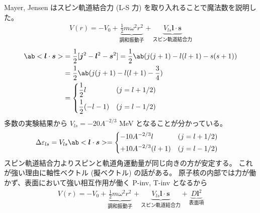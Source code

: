 \documentclass[uplatex,dvipdfmx,a4paper,11pt]{jlreq}
\numberwithin{equation}{section}
\theoremstyle{definition}
\begin{document}
Mayer, Jensen はスピン軌道結合力 (L-S 力) を取り入れることで魔法数を説明した。
\begin{align}
  V(r) = -V_0 + \underbrace{\frac{1}{2}m\omega^2r^2}_{調和振動⼦} + \underbrace{V_{ls}\bm{l}\cdot\bm{s}}_{スピン軌道結合力}
\end{align}
\begin{align}
  \ab<\bm{l}\cdot\bm{s}> & = \frac{1}{2}[\bm{j}^2 - \bm{l}^2 - \bm{s}^2] = \frac{1}{2}\ab(j(j + 1) - l(l + 1) - s(s + 1)) \\
                         & = \frac{1}{2}\ab(j(j + 1) - l(l + 1) - \frac{3}{4})                                            \\
                         & = \begin{dcases}
                               \frac{1}{2}l         & (j = l + 1/2) \\
                               \frac{1}{2}(- l - 1) & (j = l - 1/2) \\
                             \end{dcases}
\end{align}
多数の実験結果から $V_{ls} = -20A^{-2/3}$ \si{MeV} となることが分かっている。
\begin{align}
  \Delta\varepsilon_{ls} & = V_{ls}\ab<\bm{l}\cdot\bm{s}> = \begin{dcases}
                                                              -10A^{-2/3}l       & (j = l + 1/2) \\
                                                              +10A^{-2/3}(l + 1) & (j = l - 1/2) \\
                                                            \end{dcases}
\end{align}
スピン軌道結合⼒よりスピンと軌道角運動量が同じ向きの方が安定する。
これが強い理由に軸性ベクトル (擬ベクトル) の話がある。
原子核の内部では力が働かず、表面において強い相互作用が働く P-inv, T-inv となるから
\begin{align}
  V(r) = -V_0 + \underbrace{\frac{1}{2}m\omega^2r^2}_{調和振動⼦} + \underbrace{V_{ls}\bm{l}\cdot\bm{s}}_{スピン軌道結合力} + \underbrace{D\bm{l}^2}_{表面項}
\end{align}
\end{document}
